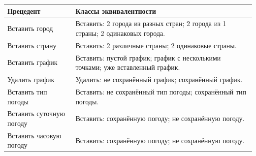 \begin{longtable}{ | m{65mm} | m{18em}| }
    \hline
        \textbf{Прецедент} & \textbf{Классы эквивалентности} \\
    \hline
        Вставить город & Вставить: 2 города из разных стран; 2 города из 1 страны; 2 одинаковых города. \\
    \hline
        Вставить страну & Вставить: 2 различные страны; 2 одинаковые страны.  \\
    \hline
        Вставить график & Вставить: пустой график; график с несколькими точками; уже вставленный график. \\
    \hline
        Удалить график & Удалить: не сохранённый график; сохранённый график. \\
    \hline
        Вставить тип погоды & Вставить: не сохранённый тип погоды; сохранённый тип погоды. \\
    \hline
        Вставить суточную погоду & Вставить: сохранённую погоду; не сохранённую погоду. \\
    \hline
        Вставить часовую погоду & Вставить: сохранённую погоду; не сохранённую погоду. \\
    \hline
    \endfirsthead
    

\end{longtable}
